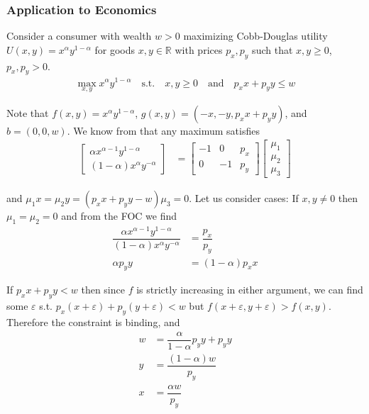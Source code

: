 \documentclass{article}
\begin{document}
\subsubsection{Application to Economics}
\label{ssub:application_to_economics}

Consider a consumer with wealth $w > 0$ maximizing Cobb-Douglas utility $U(x, y) = x^\alpha y^{1 - \alpha}$ for goods $x, y \in \mathbb{R}$ with prices $p_x, p_y$ such that $x, y \ge 0$, $p_x, p_y > 0$.
\begin{align*}
  \max_{x, y} x^{\alpha} y^{1 - \alpha}
  \quad\text{s.t.}\quad
  x, y \ge 0
  \quad\text{and}\quad
  p_x x + p_y y \le w
\end{align*}

Note that $f(x, y) = x^\alpha y^{1 - \alpha}$, $g(x, y) = (-x, -y, p_x x + p_y y)$, and $b = (0, 0, w)$. We know from  that any maximum satisfies
\begin{align*}
  \begin{bmatrix}
    \alpha x^{\alpha - 1} y^{1- \alpha}
    \\
    (1 - \alpha) x^{\alpha} y^{- \alpha}
  \end{bmatrix}
  &
  =
  \begin{bmatrix}
    -1 & 0 & p_x \\
    0 & -1 & p_y
  \end{bmatrix}
  \begin{bmatrix}
    \mu_1 \\ \mu_2 \\ \mu_3
  \end{bmatrix}
\end{align*}

and $\mu_1 x = \mu_2 y = (p_x x + p_y y - w) \mu_3 = 0$. Let us consider cases: If
$x, y \ne 0$ then $\mu_1 = \mu_2 = 0$ and from the FOC we find
\begin{align*}
  \dfrac{\alpha x^{\alpha - 1} y^{1 - \alpha}}{(1 - \alpha) x^{\alpha} y^{- \alpha}}
  &
  =
  \dfrac{p_x}{p_y}
  \\
  \alpha p_y y
  &
  =
  (1 - \alpha) p_x x
\end{align*}

If $p_x x + p_y y < w$ then since $f$ is strictly increasing in either argument, we can find some $\varepsilon$ s.t. $p_x (x + \varepsilon) + p_y (y + \varepsilon) < w$ but $f(x + \varepsilon, y + \varepsilon) > f(x, y)$. Therefore the constraint is binding, and
\begin{align*}
  w
  &
  =
  \dfrac{\alpha}{1 - \alpha} p_y y + p_y y
  \\
  y
  &
  =
  \dfrac{(1 - \alpha) w}{p_y}
  \\
  x
  &
  =
  \dfrac{\alpha w}{p_y}
\end{align*}
\end{document}
